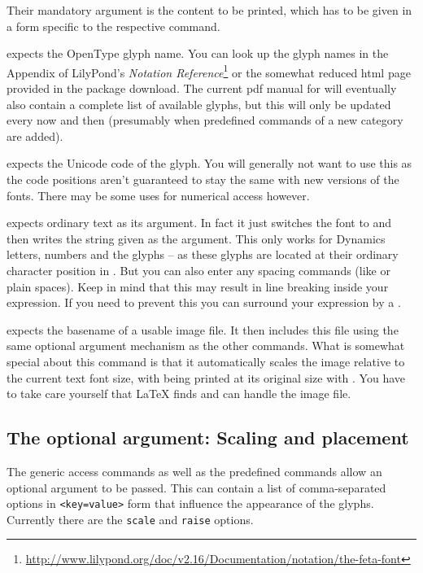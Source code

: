 \documentclass{article}
\begin{document}
Their mandatory argument is the content to be printed, which has to be given in a form specific to the respective command.

\medskip
{} expects the OpenType glyph name. 
You can look up the glyph names in the Appendix of LilyPond's \emph{Notation Reference}\footnote{\url{http://www.lilypond.org/doc/v2.16/Documentation/notation/the-feta-font}} or the somewhat reduced html page provided in the package download. 
The current pdf manual for \lilyglyphs will eventually also contain a complete list of available glyphs, but this will only be updated every now and then (presumably when predefined commands of a new category are added).

\medskip
{} expects the Unicode code of the glyph. 
You will generally not want to use this as the code positions aren't guaranteed to stay the same with new versions of the fonts. 
There may be some uses for numerical access however.

\medskip
{} expects ordinary text as its argument. 
In fact it just switches the font to \emmentaler and then writes the string given as the argument. 
This only works for Dynamics letters, numbers and the glyphs  -- as these glyphs are located at their ordinary character position in \emmentaler*. 
But you can also enter any spacing commands (like  or plain spaces). 
Keep in mind that this may result in line breaking inside your expression. 
If you need to prevent this you can surround your expression by a .

\medskip
{} expects the basename of a usable image file.
It then includes this file using the same optional argument mechanism as the other commands.
What is somewhat special about this command is that it automatically scales the image relative to the current text font size, with being printed at its original size with .
You have to take care yourself that \LaTeX{} finds and can handle the image file.


\subsection{The optional argument: Scaling and placement}
\label{subsec:optional_argument}
The generic access commands as well as the predefined commands allow an optional argument to be passed.
This can contain a list of comma-separated options in \texttt{<key=value>} form that influence the appearance of the glyphs. Currently there are the \texttt{scale} and \texttt{raise} options.
\end{document}
